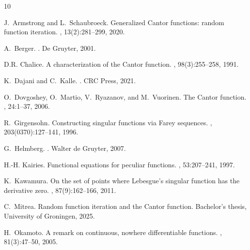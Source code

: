 \documentclass[a4paper,12pt]{article}
\begin{document}

\newpage


\begin{thebibliography}{10}

J.~Armstrong and L.~Schaubroeck.
\newblock Generalized {Cantor} functions: random function iteration.
, 13(2):281--299, 2020.

A.~Berger.
.
\newblock De Gruyter, 2001.

D.R. Chalice.
\newblock A characterization of the {Cantor} function.
, 98(3):255--258, 1991.

K.~Dajani and C.~Kalle.
.
\newblock CRC Press, 2021.

O.~Dovgoshey, O.~Martio, V.~Ryazanov, and M.~Vuorinen.
\newblock The {Cantor} function.
, 24:1--37, 2006.

R.~Girgensohn.
\newblock Constructing singular functions via {Farey} sequences.
,
  203(0370):127--141, 1996.

G.~Helmberg.
.
\newblock Walter de Gruyter, 2007.

H.-H. Kairies.
\newblock Functional equations for peculiar functions.
, 53:207--241, 1997.

K.~Kawamura.
\newblock On the set of points where {Lebesgue's} singular function has the
  derivative zero.
, 87(9):162--166, 2011.

C.~Mitrea.
\newblock Random function iteration and the {Cantor} function.
\newblock Bachelor's thesis, University of Groningen, 2025.

H.~Okamoto.
\newblock A remark on continuous, nowhere differentiable functions.
, 81(3):47--50, 2005.


\end{thebibliography}
\end{document}
